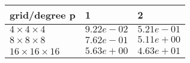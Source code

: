 \begin{tabular}{lll}
\hline
 grid/degree p            & 1          & 2          \\
\hline
 $4 \times 4 \times 4$    & $9.22e-02$ & $5.21e-01$ \\
 $8 \times 8 \times 8$    & $7.62e-01$ & $5.11e+00$ \\
 $16 \times 16 \times 16$ & $5.63e+00$ & $4.63e+01$ \\
\hline
\end{tabular}